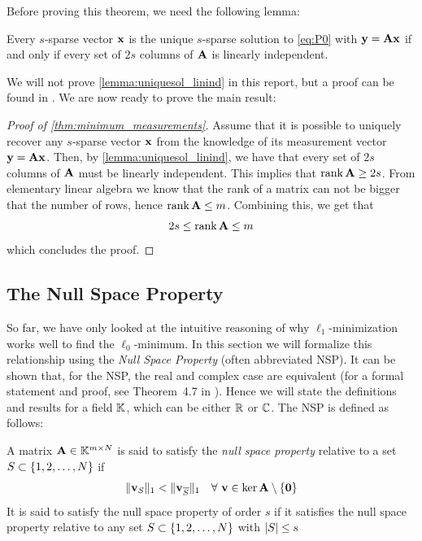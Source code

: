 Before proving this theorem, we need the following lemma:
\begin{lemma}
	\label{lemma:uniquesol_linind}
	Every $ s $-sparse vector $ \mathbf{x} $ is the unique $ s $-sparse solution to \eqref{eq:P0} with $ \mathbf{y} = \mathbf{A}\mathbf{x} $ if and only if every set of $ 2s $ columns of $ \mathbf{A} $ is linearly independent.
\end{lemma}

We will not prove \cref{lemma:uniquesol_linind} in this report, but a proof can be found in \cite[Theorem~2.13]{foucart13intro}. We are now ready to prove the main result:
\begin{proof}[Proof of \cref{thm:minimum_measurements}]
	Assume that it is possible to uniquely recover any $ s $-sparse vector $ \mathbf{x} $ from the knowledge of its measurement vector $ \mathbf{y} = \mathbf{A}\mathbf{x} $. Then, by \cref{lemma:uniquesol_linind}, we have that every set of $ 2s $ columns of $ \mathbf{A} $ must be linearly independent. This implies that $ \operatorname{rank} \mathbf{A} \geq 2s $. From elementary linear algebra we know that the rank of a matrix can not be bigger that the number of rows, hence $ \operatorname{rank} \mathbf{A} \leq m $. Combining this, we get that
	\[
		2s \leq \operatorname{rank} \mathbf{A} \leq m
	\]
	which concludes the proof.
\end{proof}





\subsection{The Null Space Property}
\label{sec:NSP}
So far, we have only looked at the intuitive reasoning of why $ \ell_{1} $-minimization works well to find the $ \ell_{0} $-minimum. In this section we will formalize this relationship using the \textit{Null Space Property} (often abbreviated NSP). It can be shown that, for the NSP, the real and complex case are equivalent (for a formal statement and proof, see Theorem~4.7 in \cite{foucart13intro}). Hence we will state the definitions and results for a field $ \mathbb{K} $, which can be either $ \mathbb{R} $ or $ \mathbb{C} $. The NSP is defined as follows:

\begin{definition} \label{def:NSP}
	A matrix $ \mathbf{A} \in \mathbb{K}^{m\times N} $ is said to satisfy the \textit{null space property} relative to a set $ S \subset \{1, 2, \ldots, N\} $ if
	\[ 
		\lVert\mathbf{v}_S\rVert_1 < \lVert\mathbf{v}_{\overline{S}}\rVert_{1} \quad \forall ~ \mathbf{v} \in \ker \mathbf{A} \setminus \{\mathbf{0}\}
	\]
	It is said to satisfy the null space property of order $ s $ if it satisfies the null space property relative to any set $ S \subset \{1, 2, \ldots, N\} $ with $ \left|S\right| \leq s $
\end{definition}

